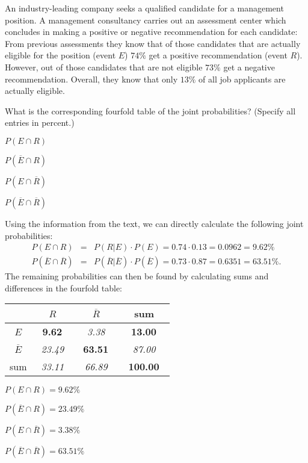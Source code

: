 

\begin{question}
An industry-leading company seeks a qualified candidate for a management position.
A management consultancy carries out an assessment center which concludes in making
a positive or negative recommendation for each candidate: From previous assessments they know that
of those candidates that are actually eligible for the position (event $E$) $74\%$
get a positive recommendation (event $R$). However, out of those candidates that are not eligible
$73\%$ get a negative recommendation. Overall, they know that only
$13\%$ of all job applicants are actually eligible.

What is the corresponding fourfold table of the joint probabilities? (Specify all entries in percent.)

\begin{answerlist}
  \item $P(E \cap R)$
  \item $P(\overline{E} \cap R)$
  \item $P(E \cap \overline{R})$
  \item $P(\overline{E} \cap \overline{R})$
\end{answerlist}
\end{question}


\begin{solution}
Using the information from the text, we can directly calculate the following joint probabilities:
\begin{eqnarray*}
  P(E \cap R) & = &
    P(R | E) \cdot P(E) = 0.74 \cdot 0.13 = 0.0962 = 9.62\%\\
  P(\overline{E} \cap \overline{R}) & = &
    P(\overline{R} | \overline{E}) \cdot P(\overline{E}) = 0.73 \cdot 0.87 = 0.6351 = 63.51\%.
\end{eqnarray*}
The remaining probabilities can then be found by calculating sums and differences in the fourfold table:

\begin{tabular}{|c|cc|c|}
\hline
                 & ~$R$~                    & ~$\overline{R}$~         & sum \\ \hline
~$E$~            & ~\bf   9.62~ & ~\it   3.38~ & ~\bf  13.00~ \\
~$\overline{E}$~ & ~\it  23.49~ & ~\bf  63.51~ & ~\it  87.00~ \\ \hline
sum              & ~\it  33.11~ & ~\it  66.89~ & ~\bf 100.00~ \\
\hline
\end{tabular}

\begin{answerlist}
  \item $P(E \cap R) =  9.62\%$
  \item $P(\overline{E} \cap R) = 23.49\%$
  \item $P(E \cap \overline{R}) =  3.38\%$
  \item $P(\overline{E} \cap \overline{R}) = 63.51\%$
\end{answerlist}
\end{solution}


